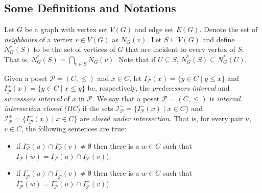 \documentclass{article}
\newcommand{\define}[1]{\emph{#1}}
\newcommand{\mI}{\ensuremath{\mathcal{I}}}
\newcommand{\mP}{\ensuremath{\mathcal{P}}}
\begin{document}
\subsection{Some Definitions and Notations}

Let $G$ be a  graph with vertex set $V(G)$ and  edge set $E(G)$.  Denote
the set of \define{neighbours} of a vertex $v \in V(G)$ as $N_G(v)$.
%
Let $S \subseteq  V(G)$ and define $N_G^*(S)$ to be  the set of vertices
of $G$ that are incident to every vertex of $S$. That is,
$N_G^*(S) = \bigcap_{v \in S} N_G(v).$
Note that if $U \subseteq S$, $N_G^*(S) \subseteq N_G^*(U)$.

Given   a    poset   $\mP   =    (C,\leq)$   and   $x   \in    C$,   let
$I_{\mP}^-(x)    =    \{y    \in    C   \mid    y    \leq    x\}$    and
$I_{\mP}^+(x)  = \{y  \in  C  \mid x  \leq  y\}$  be, respectively,  the
\define{predecessors interval} and \define{successors interval} of $x$ in
$\mP$.
%
We say  that a poset  $\mP = (C,\leq)$ is  \define{interval intersection
  closed            (IIC)}             if            the            sets
$\mI_{\mP}^-    =     \{I_{\mP}^-(x)    \mid    x    \in     C\}$    and
$\mI_{\mP}^+ =  \{I_{\mP}^+(x) \mid  x \in  C\}$ are  \define{closed under
  intersection}. That is,  for every pair $u$, $v \in  C$, the following
sentences are true:
\begin{itemize}
\item if $I_{\mP}^-(u) \cap I_{\mP}^-(v) \neq \emptyset$ then there is a
  $w \in C$ such that $I_{\mP}^-(w) = I_{\mP}^-(u) \cap I_{\mP}^-(v)$);
\item if $I_{\mP}^+(u) \cap I_{\mP}^+(v) \neq \emptyset$ then there is a
  $w \in C$ such that $I_{\mP}^+(w) = I_{\mP}^+(u) \cap I_{\mP}^+(v)$).
\end{itemize}


\end{document}
